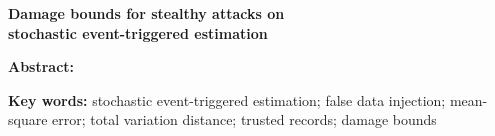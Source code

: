 \ifdefined\ECUSTSubmission
\par\bigskip
\else
\clearpage\onecolumn
\fi
\begin{center}
{\fontsize{16bp}{22bp}\selectfont\bfseries Damage bounds for stealthy attacks on\\
stochastic event-triggered estimation}
\end{center}
\noindent\textbf{Abstract: }
\par\smallskip
\noindent\textbf{Key words: }stochastic event-triggered estimation; false data injection; mean-square error; total variation distance; trusted records; damage bounds
\par
\ifdefined\ECUSTSubmission\else
\null\par\clearpage
\fi
